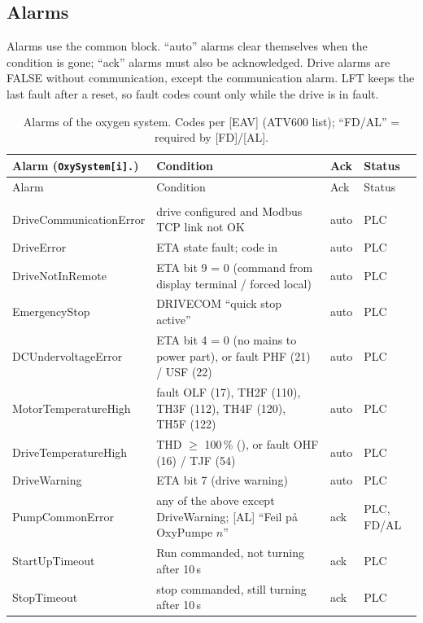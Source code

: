 \documentclass[11pt,a4paper]{article}
\begin{document}
\subsection{Alarms}
\label{sec:alarms}
Alarms use the common  block. ``auto'' alarms clear themselves when the
condition is gone; ``ack'' alarms must also be acknowledged. Drive alarms are FALSE without
communication, except the communication alarm. LFT keeps the last fault after a reset, so fault
codes count only while the drive is in fault.
\begin{small}
\begin{longtable}{@{}P{38mm}P{80mm}P{10mm}P{22mm}@{}}
\caption{Alarms of the oxygen system. Codes per [EAV] (ATV600 list); ``FD/AL'' = required by [FD]/[AL].}\label{tab:alarms}\\
\toprule
Alarm (\texttt{OxySystem[i].}) & Condition & Ack & Status \\
\midrule
\endfirsthead
\toprule
Alarm & Condition & Ack & Status \\
\midrule
\endhead
\bottomrule
\endfoot
{} \\
DriveCommunicationError & drive configured and Modbus TCP link not OK & auto & PLC \\
DriveError & ETA state fault; code in  & auto & PLC \\
DriveNotInRemote & ETA bit 9 = 0 (command from display terminal / forced local) & auto & PLC \\
EmergencyStop & DRIVECOM ``quick stop active'' & auto & PLC \\
DCUndervoltageError & ETA bit 4 = 0 (no mains to power part), or fault PHF (21) / USF (22) & auto & PLC \\
MotorTemperatureHigh & fault OLF (17), TH2F (110), TH3F (112), TH4F (120), TH5F (122) & auto & PLC \\
DriveTemperatureHigh & THD $\geq$ 100\,\% (), or fault OHF (16) / TJF (54) & auto & PLC \\
DriveWarning & ETA bit 7 (drive warning) & auto & PLC \\
PumpCommonError & any of the above except DriveWarning; [AL] ``Feil på OxyPumpe $n$'' & ack & PLC, FD/AL \\
StartUpTimeout & Run commanded, not turning after  10\,s & ack & PLC \\
StopTimeout & stop commanded, still turning after  10\,s & ack & PLC \\

\end{longtable}
\end{small}
\end{document}

